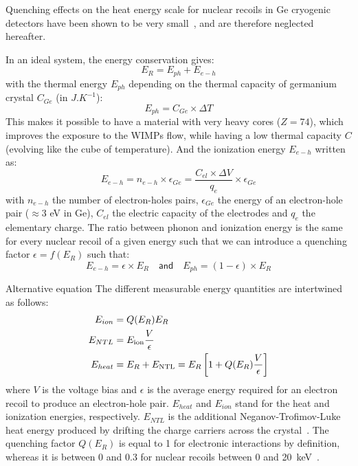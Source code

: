 Quenching effects on the heat energy scale for nuclear recoils in Ge cryogenic detectors have been shown to be very small~\cite{Benoit:2006qc,Agnese:2018nbs}, and are therefore neglected hereafter. 

In an ideal system, the energy conservation gives:
\begin{equation}
\label{energy}
E_R = E_{ph} + E_{e-h}
\end{equation}
with the thermal energy $E_{ph}$ depending on the thermal capacity of germanium crystal $C_{Ge}$ (in $J.K^{-1}$):
\begin{equation}
E_{ph} = C_{Ge} \times \Delta T
\end{equation}
This makes it possible to have a material with very heavy cores ($Z=74$), which improves the exposure to the WIMPs flow, while having a low thermal capacity $C$ (evolving like the cube of temperature). 
And the ionization energy $E_{e-h}$ written as:
\begin{equation}
E_{e-h} = n_{e-h} \times \epsilon_{Ge} = \frac{C_{el} \times \Delta V}{q_{e}} \times \epsilon_{Ge}
\end{equation}
with $n_{e-h}$ the number of electron-holes pairs, $\epsilon_{Ge}$ the energy of an electron-hole pair ($\approx 3$ eV in Ge), $C_{el}$ the electric capacity of the electrodes and $q_{e}$ the elementary charge. The ratio between phonon and ionization energy is the same for every nuclear recoil of a given energy such that we can introduce a quenching factor $\epsilon = f(E_R)$ such that:
\begin{equation}
\label{quenching}
E_{e-h} = \epsilon \times E_R \quad \textsf{and} \quad E_{ph} =(1-\epsilon) \times E_R
\end{equation}

Alternative equation
The different measurable energy quantities are intertwined as follows:
\begin{align}
    E_{ion} & = Q(E_R) E_R \\
    E_{NTL} & = E_{\rm ion}\frac{V}{\epsilon} \\
    E_{heat} & = E_R + E_{\rm NTL} = E_R\left[1+Q(E_R)\frac{V}{\epsilon}\right]
    \label{eq:GeNTL}
\end{align}
where $V$ is the voltage bias and $\epsilon$ is the average energy required for an electron recoil to produce an electron-hole pair. $E_{heat}$ and $E_{ion}$ stand for the heat and ionization energies, respectively. $E_{NTL}$ is the additional Neganov-Trofimov-Luke heat energy produced by drifting the charge carriers across the crystal~\cite{Luke,Neganov:1985khw}. The quenching factor $Q(E_R)$ is equal to 1 for electronic interactions by definition, whereas it is between 0 and 0.3 for nuclear recoils between 0 and 20~keV~\cite{Barker:2013nua}.

